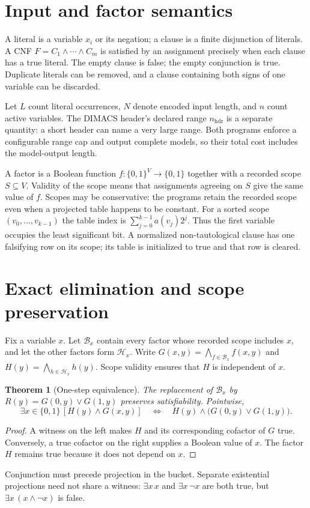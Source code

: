 \documentclass[11pt]{article}
\newtheorem{theorem}{Theorem}[section]
\newcommand{\B}{\{0,1\}}
\begin{document}
\section{Input and factor semantics}
A literal is a variable $x_i$ or its negation; a clause is a finite
disjunction of literals. A CNF $F=C_1\land\cdots\land C_m$ is satisfied
by an assignment precisely when each clause has a true literal.
The empty clause is false; the empty conjunction is true.
Duplicate literals can be removed, and a clause containing both signs
of one variable can be discarded.

Let $L$ count literal occurrences, $N$ denote encoded input length,
and $n$ count active variables. The DIMACS header's declared range
$n_{\mathrm{hdr}}$ is a separate quantity: a short header can name a very
large range. Both programs enforce a configurable range cap and output
complete models, so their total cost includes the model-output length.

A factor is a Boolean function $f:\B^V\to\B$ together with a recorded
scope $S\subseteq V$. Validity of the scope means that assignments agreeing
on $S$ give the same value of $f$. Scopes may be conservative: the programs
retain the recorded scope even when a projected table happens to be constant.
For a sorted scope $(v_0,\ldots,v_{k-1})$ the table index is
$\sum_{j=0}^{k-1}a(v_j)2^j$.
Thus the first variable occupies the least significant bit.
A normalized non-tautological clause has one falsifying row on its scope;
its table is initialized to true and that row is cleared.

\section{Exact elimination and scope preservation}
Fix a variable $x$. Let $\mathcal B_x$ contain every factor whose recorded
scope includes $x$, and let the other factors form $\mathcal H_x$.
Write $G(x,y)=\bigwedge_{f\in\mathcal B_x}f(x,y)$ and
$H(y)=\bigwedge_{h\in\mathcal H_x}h(y)$.
Scope validity ensures that $H$ is independent of $x$.

\begin{theorem}[One-step equivalence]\label{thm:step}
The replacement of $\mathcal B_x$ by $R(y)=G(0,y)\lor G(1,y)$
preserves satisfiability. Pointwise,
\begin{equation}\label{eq:central}
\exists x\in\B\,[H(y)\land G(x,y)]
\quad\Longleftrightarrow\quad
H(y)\land\bigl(G(0,y)\lor G(1,y)\bigr).
\end{equation}
\end{theorem}
\begin{proof}
A witness on the left makes $H$ and its corresponding cofactor of $G$
true. Conversely, a true cofactor on the right supplies a Boolean value
of $x$. The factor $H$ remains true because it does not depend on $x$.
\end{proof}
Conjunction must precede projection in the bucket. Separate existential
projections need not share a witness: $\exists x\,x$ and
$\exists x\,\neg x$ are both true, but
$\exists x\,(x\land\neg x)$ is false.
\end{document}
